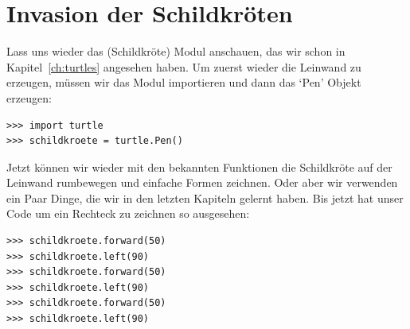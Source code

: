

\chapter{Invasion der Schildkröten}\label{ch:turtlesgalore}


Lass uns wieder das  (Schildkröte) Modul anschauen, das wir schon in Kapitel~\ref{ch:turtles} angesehen haben. Um zuerst wieder die Leinwand zu erzeugen, müssen wir das Modul importieren und dann das `Pen' Objekt erzeugen:

\begin{Verbatim}[frame=single]
>>> import turtle
>>> schildkroete = turtle.Pen()
\end{Verbatim}

Jetzt können wir wieder mit den bekannten Funktionen die Schildkröte auf der Leinwand rumbewegen und einfache Formen zeichnen. Oder aber wir verwenden ein Paar Dinge, die wir in den letzten Kapiteln gelernt haben. Bis jetzt hat unser Code um ein Rechteck zu zeichnen so ausgesehen:

\begin{Verbatim}[frame=single]
>>> schildkroete.forward(50)
>>> schildkroete.left(90)
>>> schildkroete.forward(50)
>>> schildkroete.left(90)
>>> schildkroete.forward(50)
>>> schildkroete.left(90)
\end{Verbatim}

